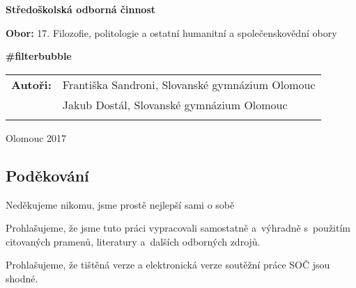 \pagestyle{empty}
\begin{center}

\medskip

\vfill
{\bfseries\Large{Středoškolská odborná činnost}}

\medskip

{{\bfseries Obor: } 17. Filozofie, politologie a ostatní humanitní a společenskovědní obory}
\vfill


\vspace{20mm}

{\LARGE\bfseries \#filterbubble}

\vfill

\begin{tabular}{ll}
\bfseries Autoři: & Františka Sandroni, Slovanské gymnázium Olomouc\\
                  & Jakub Dostál, Slovanské gymnázium Olomouc\\
\noalign{\vspace{2mm}}
\end{tabular}

\vfill
Olomouc 2017
\end{center}


\newpage
\openright

\noindent
\subsection*{Poděkování}
\noindent Neděkujeme nikomu, jsme prostě nejlepší sami o sobě



\newpage

\noindent
Prohlašujeme, že jsme tuto práci vypracovali samostatně a~výhradně
s~použitím citovaných pramenů, literatury a~dalších odborných zdrojů.

Prohlašujeme, že tištěná verze a elektronická verze soutěžní práce SOČ jsou
shodné.


